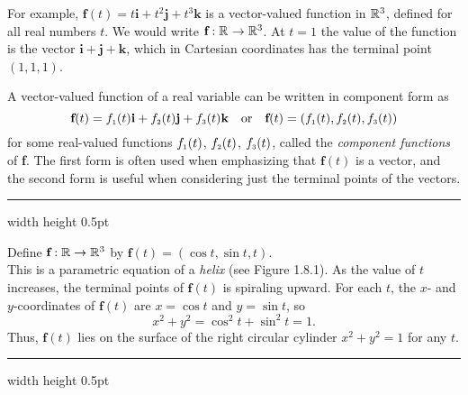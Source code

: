 For example, $\textbf{f}(t) = t \textbf{i} + t^2 \textbf{j} + t^3 \textbf{k}$ is a vector-valued function in $\mathbb{R}^{3}$,
defined for all real numbers $t$. 
We would write $\textbf{f}: \mathbb{R}^{} \rightarrow \mathbb{R}^{3}$. 
At $t = 1$
the value of the function is the vector $\textbf{i} + \textbf{j} + \textbf{k}$, which in Cartesian coordinates has the
terminal point $(1,1,1)$.

A vector-valued function of a real variable can be written in component form as
\begin{displaymath}
 \textbf{f}(t) = f_{\scriptscriptstyle 1}(t) \textbf{i} + f_{\scriptscriptstyle 2}(t) \textbf{j} + f_{\scriptscriptstyle 3}(t) \textbf{k}\quad\text{or}\quad\textbf{f}(t) = ( f_{\scriptscriptstyle 1}(t),f_{\scriptscriptstyle 2}(t),f_{\scriptscriptstyle 3}(t) )
\end{displaymath}
for some real-valued functions $f_{\scriptscriptstyle 1}(t)$, $f_{\scriptscriptstyle 2}(t)$, $f_{\scriptscriptstyle 3}(t)$, called the \emph{component 
functions} of \textbf{f}. 
The first form is often used when emphasizing that $\textbf{f}(t)$ is a vector, and the second form is useful when considering just the terminal points of the vectors.

\smallskip
\hrule width \textwidth height 0.5pt
\piccaption[]{}
\begin{exmp}
 Define $\textbf{f}: \mathbb{R} \rightarrow \mathbb{R}^{3}$ by $\textbf{f}(t) = ( \cos t , \sin t , t )$.\\ 
 This is a parametric equation of a \emph{helix} (see Figure 1.8.1). 
 As the value of $t$ increases, the terminal points of
 $\textbf{f}(t)$ is spiraling upward. 
 For each $t$, the $x$- and $y$-coordinates of $\textbf{f}(t)$
 are $x = \cos t$ and $y = \sin t$, so
 \begin{displaymath}
 x^2 + y^2 = \cos^2 t + \sin^2 t = 1.
 \end{displaymath}
 Thus, $\textbf{f}(t)$ lies on the surface of the right circular cylinder $x^2 + y^2 = 1$ for any $t$.
\end{exmp}
\hrule width \textwidth height 0.5pt
\smallskip

